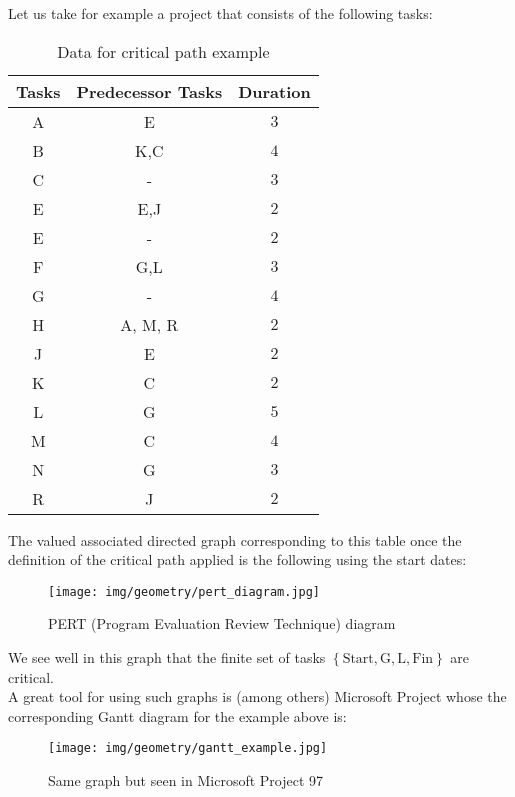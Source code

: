 {\begin{enumerate}
\begin{tcolorbox}[colframe=black,colback=white,sharp corners]
		Let us take for example a project that consists of the following tasks:
	\begin{table}[H]
	\begin{center}
		\begin{tabular}{|c|c|c|}
		  \hline
		  \rowcolor[gray]{0.75}Tasks & Predecessor Tasks & Duration \\ \hline
		  A & E & $3$ \\ \hline
		  B & K,C & $4$ \\ \hline
		  C & - & $3$ \\ \hline
		  E & E,J & $2$ \\ \hline
		  E & - & $2$ \\ \hline
		  F & G,L & $3$ \\ \hline
		  G & - & $4$ \\ \hline
		  H & A, M, R & $2$ \\ \hline
		  J & E & $2$ \\ \hline
		  K & C & $2$ \\ \hline
		  L & G & $5$ \\ \hline
		  M & C & $4$ \\ \hline
		  N & G & $3$ \\ \hline
		  R & J & $2$ \\ \hline
		\end{tabular}
	\end{center}
	\caption[]{Data for critical path example}
	\end{table}			
	The valued associated directed graph corresponding to this table once the definition of the critical path applied is the following using the start dates:	
	\end{tcolorbox}
	
	\pagebreak
	\begin{tcolorbox}[colframe=black,colback=white,sharp corners]
	\begin{figure}[H]
		\centering
		\texttt{[image: img/geometry/pert\_diagram.jpg]}
		\caption{PERT (Program Evaluation Review Technique) diagram}
	\end{figure}
	We see well in this graph that the finite set of tasks $\left\lbrace \text{Start}, \text{G}, \text{L}, \text{Fin}\right\rbrace$ are critical.\\
	
	A great tool for using such graphs is (among others) Microsoft Project whose the corresponding Gantt diagram for the example above is:
	\begin{figure}[H]
		\centering
		\texttt{[image: img/geometry/gantt\_example.jpg]}
		\caption{Same graph but seen in Microsoft Project 97}
	\end{figure}
	\end{tcolorbox}
	

\end{enumerate}}
